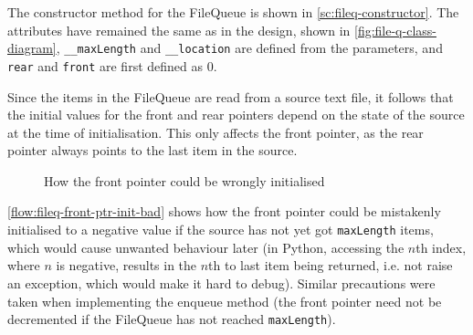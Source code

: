         The constructor method for the FileQueue is shown in \autoref{sc:fileq-constructor}. 
        The attributes have remained the same as in the design, shown in \autoref{fig:file-q-class-diagram}, \verb|__maxLength| and \verb|__location| are defined from the parameters, and \verb|rear| and \verb|front| are first defined as 0. 

        Since the items in the FileQueue are read from a source text file, it follows that the initial values for the front and rear pointers depend on the state of the source at the time of initialisation. 
        This only affects the front pointer, as the rear pointer always points to the last item in the source. 

        \begin{figure}[!ht]
            \centering
            \caption{How the front pointer could be wrongly initialised}
            \label{flow:fileq-front-ptr-init-bad}
        \end{figure}

        \autoref{flow:fileq-front-ptr-init-bad} shows how the front pointer could be mistakenly initialised to a negative value if the source has not yet got \verb|maxLength| items, which would cause unwanted behaviour later (in Python, accessing the $n$th index, where $n$ is negative, results in the $n$th to last item being returned, i.e. not raise an exception, which would make it hard to debug). 
        Similar precautions were taken when implementing the enqueue method (the front pointer need not be decremented if the FileQueue has not reached \verb|maxLength|).

